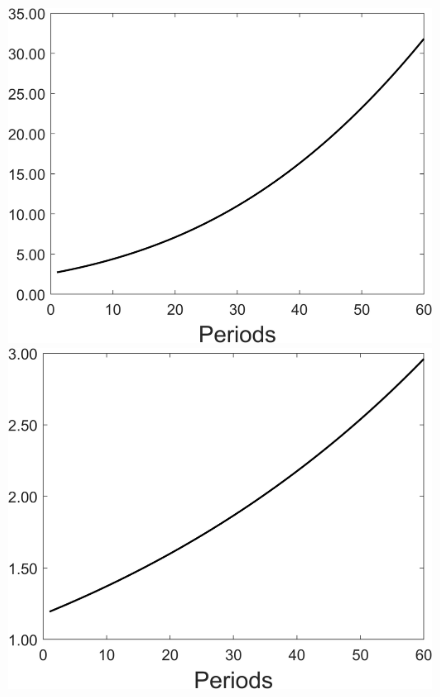 \begin{figure}[h!!]
\begin{minipage}[]{0.32\textwidth}
	\end{minipage}
	\begin{minipage}[]{0.32\textwidth}
		\includegraphics[width=1\textwidth]{../codding_model/Own/figures/Rep_agent/staticonlyRam_separate_xc_periods59_eppsilon0.40_zeta1.40_Ad08_Ac04_thetac0.70_thetad0.56_HetGrowth1_tauul0.181_util0_withtarget0_lgd0.png}
	\end{minipage}
	\begin{minipage}[]{0.32\textwidth}
		\includegraphics[width=1\textwidth]{../codding_model/Own/figures/Rep_agent/staticonlyRam_separate_ydyc_periods59_eppsilon0.40_zeta1.40_Ad08_Ac04_thetac0.70_thetad0.56_HetGrowth1_tauul0.181_util0_withtarget0_lgd0.png}
	\end{minipage}
\end{figure}

